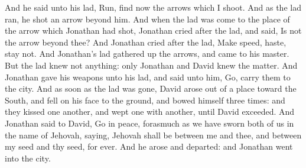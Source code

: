And he said unto his lad, Run, find now the arrows which I shoot. And as the lad ran, he shot an arrow beyond him. And when the lad was come to the place of the arrow which Jonathan had shot, Jonathan cried after the lad, and said, Is not the arrow beyond thee? And Jonathan cried after the lad, Make speed, haste, stay not. And Jonathan’s lad gathered up the arrows, and came to his master. But the lad knew not anything: only Jonathan and David knew the matter. And Jonathan gave his weapons unto his lad, and said unto him, Go, carry them to the city. And as soon as the lad was gone, David arose out of a place toward the South, and fell on his face to the ground, and bowed himself three times: and they kissed one another, and wept one with another, until David exceeded. And Jonathan said to David, Go in peace, forasmuch as we have sworn both of us in the name of Jehovah, saying, Jehovah shall be between me and thee, and between my seed and thy seed, for ever. And he arose and departed: and Jonathan went into the city. 

